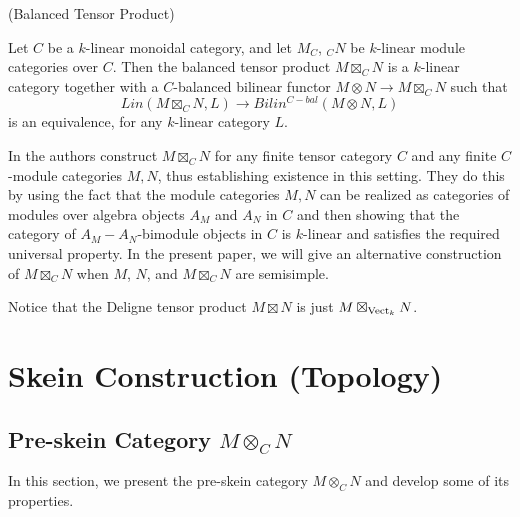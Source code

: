 \begin{definition}\label{definition/balanced-tensor-product} (Balanced Tensor Product)

  \noindent Let $C$ be a $k$-linear monoidal category, and let $M_C$, $_{C}N$
  be $k$-linear module categories over $C$. \quad Then the balanced tensor
  product $M \boxtimes_{C} N$ is a $k$-linear category together with a
  $C$-balanced bilinear functor $M\otimes N\to M\boxtimes_{C} N$ such
  that \[Lin(M \boxtimes_{C} N, L) \to Bilin^{C-bal}(M \otimes N, L)\] is an
  equivalence, for any $k$-linear category $L$.
\end{definition}

In \cite{douglas/balanced-product} the authors construct $M\boxtimes_C N$ for
any finite tensor category $C$ and any finite $C$-module categories $M, N$,
thus establishing existence in this setting. They do this by using the fact
that the module categories $M,N$ can be realized as categories of modules over
algebra objects $A_M$ and $A_N$ in $C$ and then showing that the category of
$A_M-A_N$-bimodule objects in $C$ is $k$-linear and satisfies the required
universal property. In the present paper, we will give an alternative
construction of $M\boxtimes_C N$ when $M$, $N$, and $M \boxtimes_{C} N$ are
semisimple.

\begin{remark} \label{remark/deligne-tensor-product}
  Notice that the Deligne tensor product $M \boxtimes N$ is just
  $M \boxtimes_{\operatorname{Vect}_k} N$.
\end{remark}

\section{Skein Construction (Topology)}\label{section/skein-construction}

\subsection{Pre-skein Category $M\otimes_C N$}

\noindent In this section, we present the pre-skein category $M \otimes_{C} N$
and develop some of its properties.

